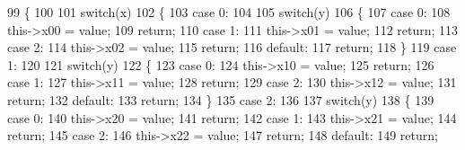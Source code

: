 \begin{DoxyCode}
99         \{
100 
101             \textcolor{keywordflow}{switch}(x)
102             \{
103                 \textcolor{keywordflow}{case} 0:
104 
105                     \textcolor{keywordflow}{switch}(y)
106                     \{
107                         \textcolor{keywordflow}{case} 0:
108                             this->x00 = value;
109                             \textcolor{keywordflow}{return};
110                         \textcolor{keywordflow}{case} 1:
111                             this->x01 = value;
112                             \textcolor{keywordflow}{return};
113                         \textcolor{keywordflow}{case} 2:
114                             this->x02 = value;
115                             \textcolor{keywordflow}{return};
116                         \textcolor{keywordflow}{default}:
117                             \textcolor{keywordflow}{return};
118                     \}
119                 \textcolor{keywordflow}{case} 1:
120 
121                     \textcolor{keywordflow}{switch}(y)
122                     \{
123                         \textcolor{keywordflow}{case} 0:
124                             this->x10 = value;
125                             \textcolor{keywordflow}{return};
126                         \textcolor{keywordflow}{case} 1:
127                             this->x11 = value;
128                             \textcolor{keywordflow}{return};
129                         \textcolor{keywordflow}{case} 2:
130                             this->x12 = value;
131                             \textcolor{keywordflow}{return};
132                         \textcolor{keywordflow}{default}:
133                             \textcolor{keywordflow}{return};
134                     \}
135                 \textcolor{keywordflow}{case} 2:
136 
137                     \textcolor{keywordflow}{switch}(y)
138                     \{
139                         \textcolor{keywordflow}{case} 0:
140                             this->x20 = value;
141                             \textcolor{keywordflow}{return};
142                         \textcolor{keywordflow}{case} 1:
143                             this->x21 = value;
144                             \textcolor{keywordflow}{return};
145                         \textcolor{keywordflow}{case} 2:
146                             this->x22 = value;
147                             \textcolor{keywordflow}{return};
148                         \textcolor{keywordflow}{default}:
149                             \textcolor{keywordflow}{return};

\end{DoxyCode}
